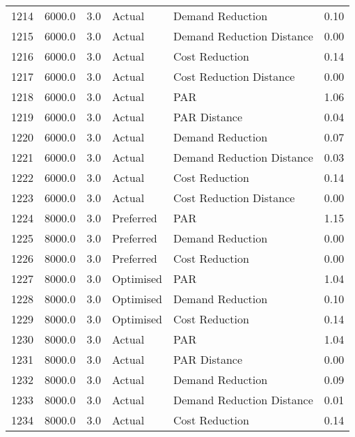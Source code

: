 \begin{longtable}{lrrllr}
1214 &       6000.0 &     3.0 &         Actual &           Demand Reduction &   0.10 \\
1215 &       6000.0 &     3.0 &         Actual &  Demand Reduction Distance &   0.00 \\
1216 &       6000.0 &     3.0 &         Actual &             Cost Reduction &   0.14 \\
1217 &       6000.0 &     3.0 &         Actual &    Cost Reduction Distance &   0.00 \\
1218 &       6000.0 &     3.0 &         Actual &                        PAR &   1.06 \\
1219 &       6000.0 &     3.0 &         Actual &               PAR Distance &   0.04 \\
1220 &       6000.0 &     3.0 &         Actual &           Demand Reduction &   0.07 \\
1221 &       6000.0 &     3.0 &         Actual &  Demand Reduction Distance &   0.03 \\
1222 &       6000.0 &     3.0 &         Actual &             Cost Reduction &   0.14 \\
1223 &       6000.0 &     3.0 &         Actual &    Cost Reduction Distance &   0.00 \\
1224 &       8000.0 &     3.0 &      Preferred &                        PAR &   1.15 \\
1225 &       8000.0 &     3.0 &      Preferred &           Demand Reduction &   0.00 \\
1226 &       8000.0 &     3.0 &      Preferred &             Cost Reduction &   0.00 \\
1227 &       8000.0 &     3.0 &      Optimised &                        PAR &   1.04 \\
1228 &       8000.0 &     3.0 &      Optimised &           Demand Reduction &   0.10 \\
1229 &       8000.0 &     3.0 &      Optimised &             Cost Reduction &   0.14 \\
1230 &       8000.0 &     3.0 &         Actual &                        PAR &   1.04 \\
1231 &       8000.0 &     3.0 &         Actual &               PAR Distance &   0.00 \\
1232 &       8000.0 &     3.0 &         Actual &           Demand Reduction &   0.09 \\
1233 &       8000.0 &     3.0 &         Actual &  Demand Reduction Distance &   0.01 \\
1234 &       8000.0 &     3.0 &         Actual &             Cost Reduction &   0.14 \\

\end{longtable}
